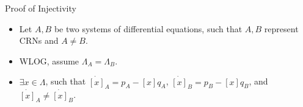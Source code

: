\begin{frame}{Proof of Injectivity}
\begin{itemize}
\item Let $A, B$ be two systems of differential equations, such that $A, B$ represent CRNs and $A \neq B$.
\item WLOG, assume $\Lambda_{A} = \Lambda_{B}$.
\item $\exists x \in \Lambda$, such that $\dot{[x]}_{A} = p_{A} - [x]q_{A}$, $\dot{[x]}_{B} = p_{B} - [x]q_{B}$, and $\dot{[x]}_{A} \neq \dot{[x]}_{B}$.
\end{itemize}
\end{frame}
